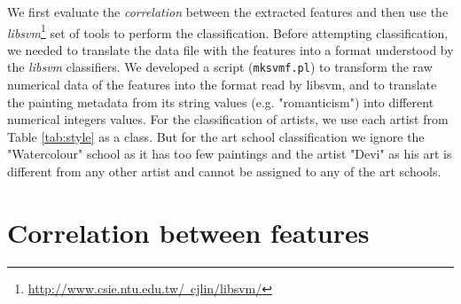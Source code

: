 \documentclass[11pt,a4paper,twoside,openright]{report}
\begin{document}
We first evaluate the \emph{correlation} between the extracted features and
then use the
\emph{libsvm}\footnote{\href{http://www.csie.ntu.edu.tw/~cjlin/libsvm/}
{http://www.csie.ntu.edu.tw/~cjlin/libsvm/}} set of tools to perform the
classification.  Before attempting classification, we needed to translate the
data file with the features into a format understood by the \emph{libsvm}
classifiers.  We developed a script (\texttt{mksvmf.pl}) to transform the raw
numerical data of the features into the format read by libsvm, and to translate
the painting metadata from its string values (e.g. "romanticism") into
different numerical integers values.  For the classification of artists, we use
each artist from Table \ref{tab:style} as a class.  But for the art school
classification we ignore the "Watercolour" school as it has too few paintings
and the artist "Devi" as his art is different from any other artist and cannot
be assigned to any of the art schools.




\section{Correlation between features}
\end{document}
